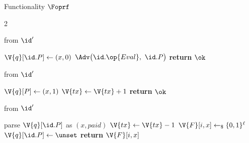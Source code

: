 \begin{interface}[nofloat]{Functionality $\Foprf$ \\
\params{$\PID$, \quad $\Ps$, \quad $\admits$, \quad
$\uses := \{(\Adv,\serves)\}$, \quad $\pars := \ell$}}
{\begin{multicols}{2}
\columnbreak

 \quad from $\id'$
\begin{algorithmic}[1]
\algcont
{}
\State $\V{q}[\id.P] \gets (x, 0)$ \label{ln:oprfopen}
\State $\Adv\bigl(\id.\op{Eval},\ \id.P\bigr)$ \label{ln:oprfblind}
\State \textbf{return} $\ok$
\algsave
\end{algorithmic}
\vspace{1.4ex}

 \quad from $\id'$
\begin{algorithmic}[1]
\algcont
{}
 \label{ln:oprfmatch}
  \State $\V{q}[P] \gets (x, 1)$ \label{ln:oprfpaid}
\EndIf
{}
  \State $\V{tx} \gets \V{tx} + 1$ \label{ln:oprfticket}
\EndIf
\State \textbf{return} $\ok$
\algsave
\end{algorithmic}
\vspace{1.4ex}

 \quad from $\id'$
\begin{algorithmic}[1]
\algcont
{}
\State parse $\V{q}[\id.P]$ as $(x, \mathit{paid})$
 \label{ln:oprfunpaid}
   \label{ln:oprfspend}
  \State $\V{tx} \gets \V{tx} - 1$
\EndIf
{}
  \State $\V{F}[i, x] \gets_{\$} \{0,1\}^{\ell}$
\EndIf
\State $\V{q}[\id.P] \gets \unset$
\State \textbf{return} $\V{F}[i, x]$ \label{ln:oprfout}
\algsave
\end{algorithmic}
\end{multicols}}
\end{interface}
